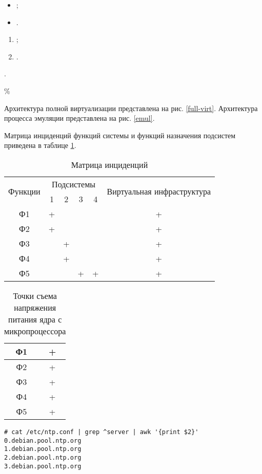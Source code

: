 

\begin{itemize}
	\item ;
	\item .
\end{itemize}

\begin{enumerate}
	\item ;
	\item .
\end{enumerate}


\cite{dc-tier}.

\%

Архитектура полной виртуализации представлена на рис. \ref{full-virt}.
Архитектура процесса эмуляции представлена на рис. \ref{emul}.

Матрица инциденций функций системы и функций назначения подсистем приведена в таблице \ref{inc-matrix}.
\begin{table}[H]
	\caption{Матрица инциденций}\label{inc-matrix}
	\begin{tabular}{|c|c|c|c|c|c|}
		\hline \multirow{2}{*}{Функции} & \multicolumn{4}{|c|}{Подсистемы} & \multirow{2}{*}{Виртуальная инфраструктура} \\
		\cline{2-5} & 1 & 2 & 3 & 4 & \\
		\hline Ф1 & + & & & & + \\
		\hline Ф2 & + & & & & + \\
		\hline Ф3 & & + & & & + \\
		\hline Ф4 & & + & & & + \\
		\hline Ф5 & & & + & + & + \\
		\hline 
	\end{tabular}
\end{table}

\begin{table}[H]
	\caption{Точки съема напряжения питания ядра с микропроцессора}
	\begin{tabular}{|c|c|}
		\hline Ф1 & +  \\
		\hline Ф2 & +  \\
		\hline Ф3 & + \\
		\hline Ф4 & + \\
		\hline Ф5 & + \\
		\hline 
	\end{tabular}
\end{table}

\begin{lstlisting}
# cat /etc/ntp.conf | grep ^server | awk '{print $2}'
0.debian.pool.ntp.org
1.debian.pool.ntp.org
2.debian.pool.ntp.org
3.debian.pool.ntp.org
\end{lstlisting}